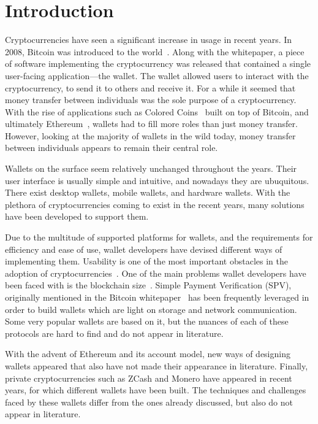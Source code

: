 \section{Introduction}
Cryptocurrencies have seen a significant increase in usage in recent years. In 2008, Bitcoin was introduced to the world~\cite{bitcoin}. 
Along with the whitepaper, a piece of software implementing the cryptocurrency was released that contained a single user-facing application---the wallet. The wallet allowed users to interact with the cryptocurrency, to send it to others and receive it. For a while it seemed that money transfer between individuals was the sole purpose of a cryptocurrency. With the rise of applications such as Colored Coins~\cite{coloredcoins} built on top of Bitcoin, and ultimately Ethereum~\cite{buterin,wood2014ethereum}, wallets had to fill more roles than just money transfer. However, looking at the majority of wallets in the wild today, money transfer between individuals appears to remain their central role.

Wallets on the surface seem relatively unchanged throughout the years. Their user interface is usually simple and intuitive, and nowadays they are ubuquitous. There exist desktop wallets, mobile wallets, and hardware wallets. With the plethora of cryptocurrencies coming to exist in the recent years, many solutions have been developed to support them.

Due to the multitude of supported platforms for wallets, and the requirements for efficiency and ease of use, wallet developers have devised different ways of implementing them.
Usability is one of the most important obstacles in the adoption of cryptocurrencies~\cite{meiklejohn2018top}.
One of the main problems wallet developers have been faced with is the blockchain size~\cite{meiklejohn2018top,sok}. Simple Payment Verification (SPV), originally mentioned in the Bitcoin whitepaper~\cite{bitcoin} has been frequently leveraged in order to build wallets which are light on storage and network communication. Some very popular wallets are based on it, but the nuances of each of these protocols are hard to find and do not appear in literature.

With the advent of Ethereum and its account model, new ways of designing wallets appeared that also have not made their appearance in literature. Finally, private cryptocurrencies such as ZCash and Monero have appeared in recent years, for which different wallets have been built. The techniques and challenges faced by these wallets differ from the ones already discussed, but also do not appear in literature.

